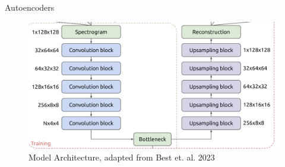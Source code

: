 \begin{frame}{Autoencoders}
    \centering
    \begin{figure}
        \includegraphics[height=\textheight,width=\textwidth,keepaspectratio]{images/architecture.png}
        \caption{Model Architecture, adapted from Best et. al. 2023}
    \end{figure} 
\end{frame}
            

